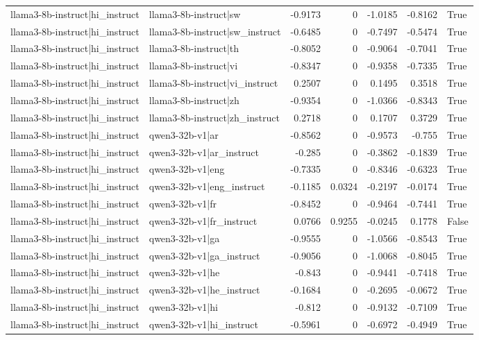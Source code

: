 \begin{table}
\begin{tabular}{l l r r r r l}
llama3-8b-instruct|hi_instruct & llama3-8b-instruct|sw & -0.9173 & 0 & -1.0185 & -0.8162 & True \\
llama3-8b-instruct|hi_instruct & llama3-8b-instruct|sw_instruct & -0.6485 & 0 & -0.7497 & -0.5474 & True \\
llama3-8b-instruct|hi_instruct & llama3-8b-instruct|th & -0.8052 & 0 & -0.9064 & -0.7041 & True \\
llama3-8b-instruct|hi_instruct & llama3-8b-instruct|vi & -0.8347 & 0 & -0.9358 & -0.7335 & True \\
llama3-8b-instruct|hi_instruct & llama3-8b-instruct|vi_instruct & 0.2507 & 0 & 0.1495 & 0.3518 & True \\
llama3-8b-instruct|hi_instruct & llama3-8b-instruct|zh & -0.9354 & 0 & -1.0366 & -0.8343 & True \\
llama3-8b-instruct|hi_instruct & llama3-8b-instruct|zh_instruct & 0.2718 & 0 & 0.1707 & 0.3729 & True \\
llama3-8b-instruct|hi_instruct & qwen3-32b-v1|ar & -0.8562 & 0 & -0.9573 & -0.755 & True \\
llama3-8b-instruct|hi_instruct & qwen3-32b-v1|ar_instruct & -0.285 & 0 & -0.3862 & -0.1839 & True \\
llama3-8b-instruct|hi_instruct & qwen3-32b-v1|eng & -0.7335 & 0 & -0.8346 & -0.6323 & True \\
llama3-8b-instruct|hi_instruct & qwen3-32b-v1|eng_instruct & -0.1185 & 0.0324 & -0.2197 & -0.0174 & True \\
llama3-8b-instruct|hi_instruct & qwen3-32b-v1|fr & -0.8452 & 0 & -0.9464 & -0.7441 & True \\
llama3-8b-instruct|hi_instruct & qwen3-32b-v1|fr_instruct & 0.0766 & 0.9255 & -0.0245 & 0.1778 & False \\
llama3-8b-instruct|hi_instruct & qwen3-32b-v1|ga & -0.9555 & 0 & -1.0566 & -0.8543 & True \\
llama3-8b-instruct|hi_instruct & qwen3-32b-v1|ga_instruct & -0.9056 & 0 & -1.0068 & -0.8045 & True \\
llama3-8b-instruct|hi_instruct & qwen3-32b-v1|he & -0.843 & 0 & -0.9441 & -0.7418 & True \\
llama3-8b-instruct|hi_instruct & qwen3-32b-v1|he_instruct & -0.1684 & 0 & -0.2695 & -0.0672 & True \\
llama3-8b-instruct|hi_instruct & qwen3-32b-v1|hi & -0.812 & 0 & -0.9132 & -0.7109 & True \\
llama3-8b-instruct|hi_instruct & qwen3-32b-v1|hi_instruct & -0.5961 & 0 & -0.6972 & -0.4949 & True \\

\end{tabular}
\end{table}
